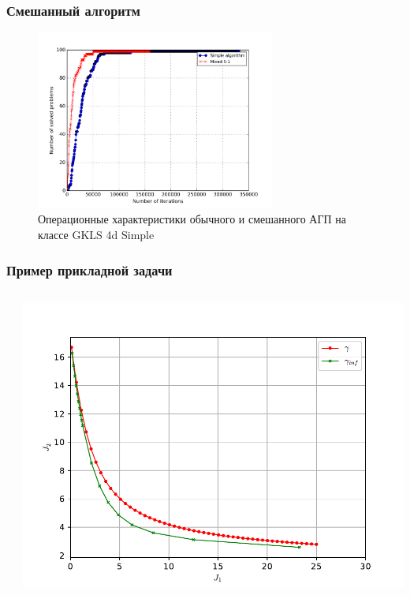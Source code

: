 \documentclass[aspectratio=1610]{beamer}
\begin{document}
\begin{frame}
  \frametitle{Смешанный алгоритм}
  \begin{figure}
    \center
      \includegraphics[width=0.7\textwidth]{mixed_op4d.png}
      \caption*{Операционные характеристики обычного и смешанного АГП на классе GKLS 4d Simple}
  \end{figure}
\end{frame}

\begin{frame}
  \frametitle{Пример прикладной задачи}
  \begin{columns}
    \begin{column}{0.5\textwidth}

    \end{column}
    \begin{column}{0.5\textwidth}
      \centerline{\includegraphics[width=1.2\textwidth]{solution.pdf}}
    \end{column}
  \end{columns}

\end{frame}
\end{document}
